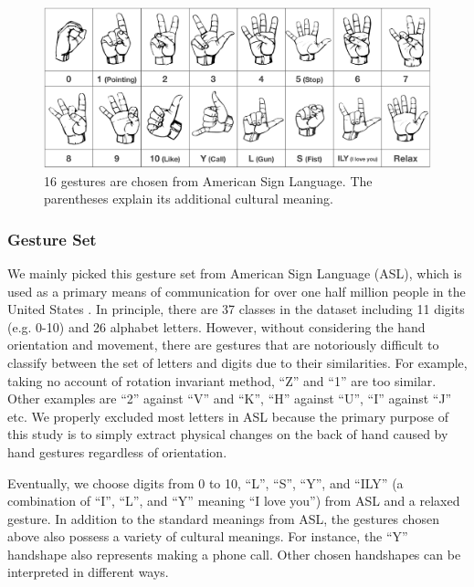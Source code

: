 \documentclass{sigchi}
\begin{document}
\begin{figure}
  \begin{center}
  \includegraphics[width=1\columnwidth]{figures/gestureSet_16_v3.pdf}
  \caption{16 gestures are chosen from American Sign Language. The parentheses explain its additional cultural meaning.}
  \label{fig:gestureSet16}
  \end{center}
\end{figure}

\subsubsection{Gesture Set}

We mainly picked this gesture set from American Sign Language (ASL), which is used as a primary means of communication for over one half million people in the United States \cite{How_Many_People_Use_ASL}. 
In principle, there are 37 classes in the dataset including 11 digits (e.g. 0-10) and 26 alphabet letters. However, without considering the hand orientation and movement, there are gestures that are notoriously difficult to classify between the set of letters and digits due to their similarities.
For example, taking no account of rotation invariant method, ``Z'' and ``1'' are too similar.
Other examples are ``2'' against ``V'' and ``K'', ``H'' against ``U'', ``I'' against ``J'' etc.
We properly excluded most letters in ASL because the primary purpose of this study is to simply extract physical changes on the back of hand caused by hand gestures regardless of orientation.

Eventually, we choose digits from 0 to 10, ``L'', ``S'', ``Y'', and ``ILY'' (a combination of ``I'', ``L'', and ``Y'' meaning ``I love you'') from ASL and a relaxed gesture. In addition to the standard meanings from ASL, the gestures chosen above also possess a variety of cultural meanings. For instance, the ``Y'' handshape also represents making a phone call. Other chosen handshapes can be interpreted in different ways.
\end{document}
